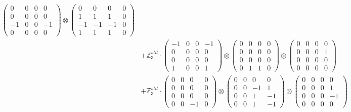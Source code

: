 \documentclass{article}
\begin{document}
{\begin{align}
            \begin{pmatrix} 0 & 0 & 0 & 0 \\ 0 & 0 & 0 & 0 \\ -1 & 0 & 0 & -1 \\ 0 & 0 & 0 & 0 \end{pmatrix} \otimes 
            \begin{pmatrix} 0 & 0 & 0 & 0 \\ 1 & 1 & 1 & 0 \\ -1 & -1 & -1 & 0 \\ 1 & 1 & 1 & 0 \end{pmatrix} \\ 
        &+ \label{Rs16-Rc11-Solution-4-c20} \mathbb{Z}_3^{std} \cdot 
            \begin{pmatrix} -1 & 0 & 0 & -1 \\ 0 & 0 & 0 & 0 \\ 0 & 0 & 0 & 0 \\ 1 & 0 & 0 & 1 \end{pmatrix} \otimes 
            \begin{pmatrix} 0 & 0 & 0 & 0 \\ 0 & 0 & 0 & 0 \\ 0 & 0 & 0 & 0 \\ 0 & 1 & 1 & 0 \end{pmatrix} \otimes 
            \begin{pmatrix} 0 & 0 & 0 & 0 \\ 0 & 0 & 0 & 1 \\ 0 & 0 & 0 & 0 \\ 0 & 0 & 0 & 0 \end{pmatrix} \\ 
        &+ \label{Rs16-Rc11-Solution-4-c21} \mathbb{Z}_3^{std} \cdot 
            \begin{pmatrix} 0 & 0 & 0 & 0 \\ 0 & 0 & 0 & 0 \\ 0 & 0 & 0 & 0 \\ 0 & 0 & -1 & 0 \end{pmatrix} \otimes 
            \begin{pmatrix} 0 & 0 & 0 & 0 \\ 0 & 0 & -1 & 1 \\ 0 & 0 & 1 & -1 \\ 0 & 0 & 1 & -1 \end{pmatrix} \otimes 
            \begin{pmatrix} 0 & 0 & 0 & 0 \\ 0 & 0 & 0 & 1 \\ 0 & 0 & 0 & -1 \\ 0 & 0 & 0 & 0 \end{pmatrix} \\ 

\end{align}}
\end{document}
